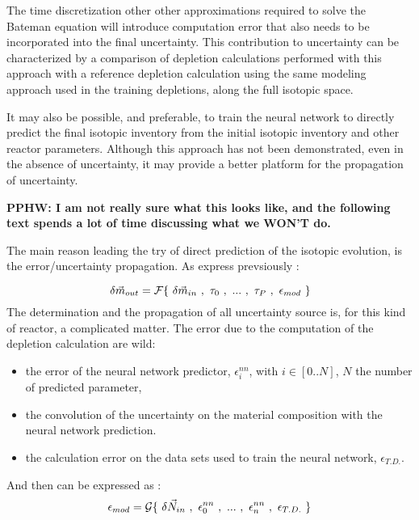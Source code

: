 \documentclass[dvips,12pt]{article}
\newcommand{\comment}[1]
{{\bfseries \color{red} #1}}
\begin{document}
The time discretization other other approximations
required to solve the Bateman equation will
introduce computation error that also needs to be
incorporated into the final uncertainty. This
contribution to uncertainty can be characterized
by a comparison of depletion calculations
performed with this approach with a reference
depletion calculation using the same modeling
approach used in the training depletions, along
the full isotopic space.


It may also be possible, and preferable, to train
the neural network to directly predict the final
isotopic inventory from the initial isotopic
inventory and other reactor parameters.  Although
this approach has not been demonstrated, even in
the absence of uncertainty, it may provide a
better platform for the propagation of
uncertainty.

\comment{PPHW: I am not really sure what this
  looks like, and the following text spends a lot
  of time discussing what we WON'T do.}

The main reason leading the try of direct
prediction of the isotopic evolution, is the
error/uncertainty propagation. As express
prevsiously :

\begin{equation}
\delta \vec{m}_{out} = {\cal F}\{~\delta\vec{m}_{in}~,~\tau_0~,~...~,~\tau_P~,~\epsilon_{mod}~\}
\end{equation}
The determination and the propagation of all
uncertainty source is, for this kind of reactor, a
complicated matter. The error due to the
computation of the depletion calculation are wild:
\begin{itemize}
\item the error of the neural network predictor,
  $\epsilon^{nn}_{i}$, with $i\in[0..N]$, $N$ the
  number of predicted parameter,
\item the convolution of the uncertainty on the
  material composition with the neural network
  prediction.
\item the calculation error on the data sets used
  to train the neural network, $\epsilon_{T.D.}$.
\end{itemize}
And then can be expressed as :
\begin{equation}
\epsilon_{mod} = {\cal G}\{~\delta\vec{N}_{in}~,~\epsilon^{nn}_{0}~,~...~,~\epsilon^{nn}_{n}~,~\epsilon_{T.D.}~\}
\end{equation}
\end{document}
